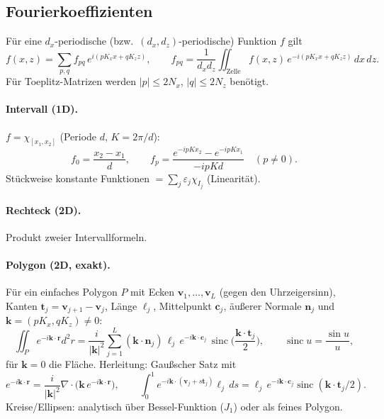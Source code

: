 \subsection{Fourierkoeffizienten}
Für eine $d_x$-periodische (bzw.\ $(d_x,d_z)$-periodische) Funktion $f$ gilt
\begin{equation}
  f(x,z)=\sum_{p,q}f_{pq}\,e^{i(pK_xx+qK_zz)},\qquad
  f_{pq}=\frac{1}{d_xd_z}\iint_{\text{Zelle}}f(x,z)\,e^{-i(pK_xx+qK_zz)}\,dx\,dz .
  \label{eq:fcoef}
\end{equation}
Für Toeplitz-Matrizen werden $|p|\le2N_x$, $|q|\le2N_z$ benötigt.

\paragraph{Intervall (1D).} $f=\chi_{[x_1,x_2]}$ (Periode $d$, $K=2\pi/d$):
\begin{equation}
  f_0=\frac{x_2-x_1}{d},\qquad f_p=\frac{e^{-ipKx_2}-e^{-ipKx_1}}{-ipKd}\quad(p\ne0).
  \label{eq:interval}
\end{equation}
Stückweise konstante Funktionen $=\sum_j\varepsilon_j\chi_{I_j}$ (Linearität).

\paragraph{Rechteck (2D).} Produkt zweier Intervallformeln.

\paragraph{Polygon (2D, exakt).} Für ein einfaches Polygon $P$ mit Ecken $\mathbf v_1,\dots,\mathbf v_L$
(gegen den Uhrzeigersinn), Kanten $\mathbf t_j=\mathbf v_{j+1}-\mathbf v_j$, Länge $\ell_j$, Mittelpunkt
$\mathbf c_j$, äußerer Normale $\mathbf n_j$ und $\mathbf k=(pK_x,qK_z)\neq0$:
\begin{equation}
  \iint_Pe^{-i\mathbf k\cdot\mathbf r}d^2r=\frac{i}{|\mathbf k|^2}\sum_{j=1}^{L}(\mathbf k\cdot\mathbf n_j)\,\ell_j\,
  e^{-i\mathbf k\cdot\mathbf c_j}\,\operatorname{sinc}\Big(\frac{\mathbf k\cdot\mathbf t_j}{2}\Big),\qquad
  \operatorname{sinc}u=\frac{\sin u}{u},
  \label{eq:polygon}
\end{equation}
für $\mathbf k=0$ die Fläche. Herleitung: Gaußscher Satz mit
\[
  e^{-i\mathbf k\cdot\mathbf r}=\frac{i}{|\mathbf k|^2}\nabla\cdot\big(\mathbf k\,e^{-i\mathbf k\cdot\mathbf r}\big),\qquad
  \int_0^1e^{-i\mathbf k\cdot(\mathbf v_j+s\mathbf t_j)}\ell_j\,ds=\ell_j\,e^{-i\mathbf k\cdot\mathbf c_j}\operatorname{sinc}(\mathbf k\cdot\mathbf t_j/2).
\]
Kreise/Ellipsen: analytisch über Bessel-Funktion ($J_1$) oder als feines Polygon.

